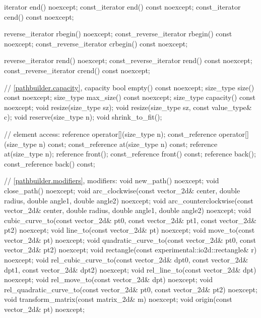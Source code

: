 \begin{codeblock}
{{{{{    iterator end() noexcept;
    const_iterator end() const noexcept;
    const_iterator cend() const noexcept;
    
    reverse_iterator rbegin() noexcept;
    const_reverse_iterator rbegin() const noexcept;
    const_reverse_iterator crbegin() const noexcept;

    reverse_iterator rend() noexcept;
    const_reverse_iterator rend() const noexcept;
    const_reverse_iterator crend() const noexcept;
    
    // \ref{pathbuilder.capacity}, capacity
    bool empty() const noexcept;
    size_type size() const noexcept;
    size_type max_size() const noexcept;
    size_type capacity() const noexcept;
    void resize(size_type sz);
    void resize(size_type sz, const value_type& c);
    void reserve(size_type n);
    void shrink_to_fit();

    // element access:
    reference operator[](size_type n);
    const_reference operator[](size_type n) const;
    const_reference at(size_type n) const;
    reference at(size_type n);
    reference front();
    const_reference front() const;
    reference back();
    const_reference back() const;

    // \ref{pathbuilder.modifiers}, modifiers:
    void new_path() noexcept;
    void close_path() noexcept;
    void arc_clockwise(const vector_2d& center, double radius, double angle1,
    double angle2) noexcept;
    void arc_counterclockwise(const vector_2d& center, double radius,
    double angle1, double angle2) noexcept;
    void cubic_curve_to(const vector_2d& pt0, const vector_2d& pt1,
    const vector_2d& pt2) noexcept;
    void line_to(const vector_2d& pt) noexcept;
    void move_to(const vector_2d& pt) noexcept;
    void quadratic_curve_to(const vector_2d& pt0, const vector_2d& pt2)
    noexcept;
    void rectangle(const experimental::io2d::rectangle& r) noexcept;
    void rel_cubic_curve_to(const vector_2d& dpt0, const vector_2d& dpt1,
    const vector_2d& dpt2) noexcept;
    void rel_line_to(const vector_2d& dpt) noexcept;
    void rel_move_to(const vector_2d& dpt) noexcept;
    void rel_quadratic_curve_to(const vector_2d& pt0, const vector_2d& pt2)
    noexcept;
    void transform_matrix(const matrix_2d& m) noexcept;
    void origin(const vector_2d& pt) noexcept;
    
}}}}}
\end{codeblock}
